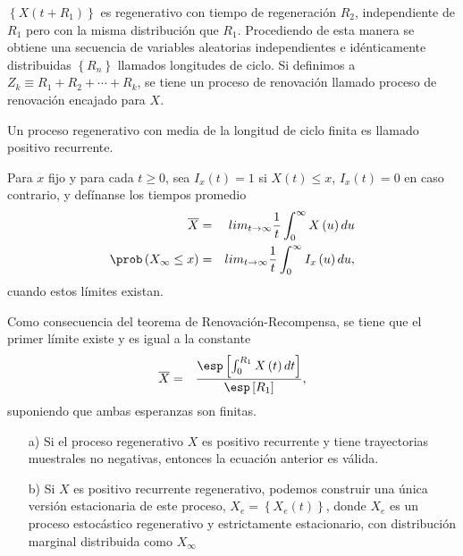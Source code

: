 $\left\{X\left(t+R_{1}\right)\right\}$ es regenerativo con tiempo de regeneraci\'on $R_{2}$, independiente de $R_{1}$ pero con la misma distribuci\'on que $R_{1}$. Procediendo de esta manera se obtiene una secuencia de variables aleatorias independientes e id\'enticamente distribuidas $\left\{R_{n}\right\}$ llamados longitudes de ciclo. Si definimos a $Z_{k}\equiv R_{1}+R_{2}+\cdots+R_{k}$, se tiene un proceso de renovaci\'on llamado proceso de renovaci\'on encajado para $X$.

\begin{Note}
Un proceso regenerativo con media de la longitud de ciclo finita es llamado positivo recurrente.
\end{Note}


\begin{Def}
Para $x$ fijo y para cada $t\geq0$, sea $I_{x}\left(t\right)=1$ si $X\left(t\right)\leq x$,  $I_{x}\left(t\right)=0$ en caso contrario, y def\'inanse los tiempos promedio
\begin{eqnarray*}
\overline{X}&=&lim_{t\rightarrow\infty}\frac{1}{t}\int_{0}^{\infty}X\left(u\right)du\\
\prob\left(X_{\infty}\leq x\right)&=&lim_{t\rightarrow\infty}\frac{1}{t}\int_{0}^{\infty}I_{x}\left(u\right)du,
\end{eqnarray*}
cuando estos l\'imites existan.
\end{Def}

Como consecuencia del teorema de Renovaci\'on-Recompensa, se tiene que el primer l\'imite  existe y es igual a la constante
\begin{eqnarray*}
\overline{X}&=&\frac{\esp\left[\int_{0}^{R_{1}}X\left(t\right)dt\right]}{\esp\left[R_{1}\right]},
\end{eqnarray*}
suponiendo que ambas esperanzas son finitas.

\begin{Note}
\begin{itemize}
\item[a)] Si el proceso regenerativo $X$ es positivo recurrente y tiene trayectorias muestrales no negativas, entonces la ecuaci\'on anterior es v\'alida.
\item[b)] Si $X$ es positivo recurrente regenerativo, podemos construir una \'unica versi\'on estacionaria de este proceso, $X_{e}=\left\{X_{e}\left(t\right)\right\}$, donde $X_{e}$ es un proceso estoc\'astico regenerativo y estrictamente estacionario, con distribuci\'on marginal distribuida como $X_{\infty}$
\end{itemize}
\end{Note}
